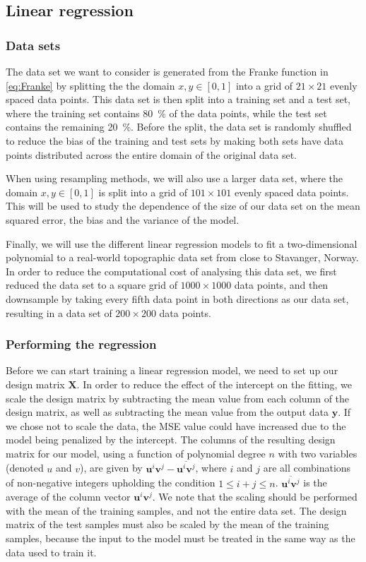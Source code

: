 \documentclass[12pt]{article}
\begin{document}
\subsection{Linear regression}
\subsubsection{Data sets}
The data set we want to consider is generated from the Franke function in \autoref{eq:Franke} by splitting the the domain $x, y \in \left[ 0, 1 \right]$ into a grid of $21\times21$ evenly spaced data points. This data set is then split into a training set and a test set, where the training set contains \SI{80}{\%} of the data points, while the test set contains the remaining \SI{20}{\%}. Before the split, the data set is randomly shuffled to reduce the bias of the training and test sets by making both sets have data points distributed across the entire domain of the original data set. 

When using resampling methods, we will also use a larger data set, where the domain $x, y \in \left[ 0, 1 \right]$ is split into a grid of $101\times101$ evenly spaced data points. This will be used to study the dependence of the size of our data set on the mean squared error, the bias and the variance of the model.

Finally, we will use the different linear regression models to fit a two-dimensional polynomial to a real-world topographic data set from close to Stavanger, Norway. In order to reduce the computational cost of analysing this data set, we first reduced the data set to a square grid of $1000\times1000$ data points, and then downsample by taking every fifth data point in both directions as our data set, resulting in a data set of $200\times200$ data points.

\subsubsection{Performing the regression}
Before we can start training a linear regression model, we need to set up our design matrix $\boldsymbol{X}$. In order to reduce the effect of the intercept on the fitting, we scale the design matrix by subtracting the mean value from each column of the design matrix, as well as subtracting the mean value from the output data $\boldsymbol{y}$. If we chose not to scale the data, the MSE value could have increased due to the model being penalized by the intercept. The columns of the resulting design matrix for our model, using a function of polynomial degree $n$ with two variables (denoted $u$ and $v$), are given by $\boldsymbol{u}^i\boldsymbol{v}^j - \overline{\boldsymbol{u}^i\boldsymbol{v}^j}$, where $i$ and $j$ are all combinations of non-negative integers upholding the condition $1 \leq i + j \leq n$. $\overline{\boldsymbol{u}^i\boldsymbol{v}^j}$ is the average of the column vector $\boldsymbol{u}^i\boldsymbol{v}^j$. We note that the scaling should be performed with the mean of the training samples, and not the entire data set. The design matrix of the test samples must also be scaled by the mean of the training samples, because the input to the model must be treated in the same way as the data used to train it.
\end{document}
